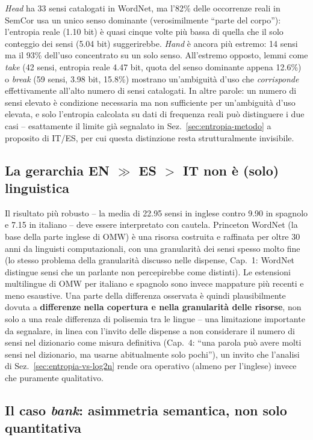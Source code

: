 \documentclass[12pt,a4paper]{article}
\begin{document}
\textit{Head} ha 33 sensi catalogati in WordNet, ma l'82\% delle occorrenze reali in SemCor usa un unico senso dominante (verosimilmente ``parte del corpo''): l'entropia reale (1.10 bit) \`e quasi cinque volte pi\`u bassa di quella che il solo conteggio dei sensi (5.04 bit) suggerirebbe. \textit{Hand} \`e ancora pi\`u estremo: 14 sensi ma il 93\% dell'uso concentrato su un solo senso. All'estremo opposto, lemmi come \textit{take} (42 sensi, entropia reale 4.47 bit, quota del senso dominante appena 12.6\%) o \textit{break} (59 sensi, 3.98 bit, 15.8\%) mostrano un'ambiguit\`a d'uso che \emph{corrisponde} effettivamente all'alto numero di sensi catalogati. In altre parole: un numero di sensi elevato \`e condizione necessaria ma non sufficiente per un'ambiguit\`a d'uso elevata, e solo l'entropia calcolata su dati di frequenza reali pu\`o distinguere i due casi -- esattamente il limite gi\`a segnalato in Sez.~\ref{sec:entropia-metodo} a proposito di IT/ES, per cui questa distinzione resta strutturalmente invisibile.

\subsection{La gerarchia EN $\gg$ ES $>$ IT non \`e (solo) linguistica}

Il risultato pi\`u robusto -- la media di 22.95 sensi in inglese contro 9.90 in spagnolo e 7.15 in italiano -- deve essere interpretato con cautela. Princeton WordNet (la base della parte inglese di OMW) \`e una risorsa costruita e raffinata per oltre 30 anni da linguisti computazionali, con una granularit\`a dei sensi spesso molto fine (lo stesso problema della granularit\`a discusso nelle dispense, Cap.~1: WordNet distingue sensi che un parlante non percepirebbe come distinti). Le estensioni multilingue di OMW per italiano e spagnolo sono invece mappature pi\`u recenti e meno esaustive. Una parte della differenza osservata \`e quindi plausibilmente dovuta a \textbf{differenze nella copertura e nella granularit\`a delle risorse}, non solo a una reale differenza di polisemia tra le lingue -- una limitazione importante da segnalare, in linea con l'invito delle dispense a non considerare il numero di sensi nel dizionario come misura definitiva (Cap.~4: ``una parola pu\`o avere molti sensi nel dizionario, ma usarne abitualmente solo pochi''), un invito che l'analisi di Sez.~\ref{sec:entropia-vs-log2n} rende ora operativo (almeno per l'inglese) invece che puramente qualitativo.

\subsection{Il caso \textit{bank}: asimmetria semantica, non solo quantitativa}
\end{document}
